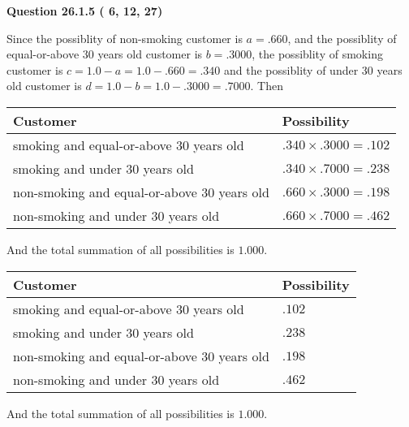 \documentclass[12pt]{article}
\begin{document}
{\textbf{\Large{Question
26.1.5 
 (          6,         12,         27)
}}}
  
  
 
 
\noindent{}

Since the possiblity of  %
 non-smoking customer is $ a =  %
.660 $,
and the possiblity of  %
equal-or-above 30 years old customer is $ b =  %
.3000 $,
the possiblity of  %
smoking customer is $ c = 1.0 - a = 1.0 -
.660
=  %
.340 $ and the possiblity of  %
under 30 years old
customer is $ d = 1.0 - b = 1.0 -  %
.3000 =  %
.7000  $.
Then
 
\noindent
\begin{tabular}{|l|l|}
\hline
Customer & Possibility \\
\hline
smoking  and  %
equal-or-above 30 years old  &
  $ %
.340 \times  %
.3000 =  %
.102$ \\
\hline
smoking  and  %
under 30 years old &
  $ %
.340 \times  %
.7000 =  %
.238$ \\
\hline
 non-smoking and  %
equal-or-above 30 years old  &
  $ %
.660 \times  %
.3000 =  %
.198$ \\
\hline
 non-smoking and  %
under 30 years old &
  $ %
.660 \times  %
.7000 =  %
.462$ \\
\hline
\end{tabular}
 
\noindent
And the total summation of all possibilities is $  %
1.000 $.
 
 
 
 
 
 
\noindent{}

 
\noindent
\begin{tabular}{|l|l|}
\hline
Customer & Possibility \\
\hline
smoking  and  %
equal-or-above 30 years old &
  $ %
.102$ \\
\hline
smoking  and  %
under 30 years old &
  $ %
.238$ \\
\hline
 non-smoking and  %
equal-or-above 30 years old &
  $ %
.198$ \\
\hline
 non-smoking and  %
under 30 years old &
  $ %
.462$ \\
\hline
\end{tabular}
 
\noindent
 And the total summation of all possibilities is $  %
1.000 $.
 
\end{document}
